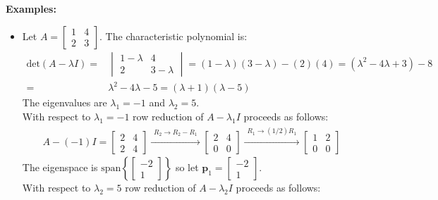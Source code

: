 \documentclass{article}
\begin{document}
\vspace{5mm}


\textbf{Examples:}
\begin{itemize}
\item Let \(A = \begin{bmatrix} 1 & 4 \\ 2 & 3 \end{bmatrix}\). The characteristic polynomial is:
\begin{align*}
\text{det}(A - \lambda I) = & \begin{vmatrix}
1 - \lambda & 4 \\ 
2 & 3 - \lambda 
\end{vmatrix} = (1 - \lambda)(3 - \lambda) - (2)(4) = (\lambda^2 - 4\lambda + 3) - 8 \\
= & \lambda^2 - 4\lambda - 5 = (\lambda + 1)(\lambda - 5)
\end{align*}
The eigenvalues are \(\lambda_1 = -1\) and \(\lambda_2 = 5\). \\
With respect to \(\lambda_1 = -1\) row reduction of \(A - \lambda_1 I\) proceeds as follows: 
\begin{align*}
A - (-1) I = 
\begin{bmatrix} 
2 & 4 \\ 
2 & 4 
\end{bmatrix} 
\xrightarrow{\begin{array}{c} R_2 \rightarrow R_2 - R_1 \end{array}} 
\begin{bmatrix} 
2 & 4 \\ 
0 & 0 
\end{bmatrix} 
\xrightarrow{\begin{array}{c} R_1 \rightarrow (1/2)R_1 \end{array}} 
\begin{bmatrix} 
1 & 2 \\ 
0 & 0 
\end{bmatrix} 
\end{align*} 
The eigenspace is \(\text{span}\left\{\begin{bmatrix} -2 \\ 1 \end{bmatrix}\right\}\) so let \(\mathbf{p}_1 = \begin{bmatrix} -2 \\ 1 \end{bmatrix}\). \\
With respect to \(\lambda_2 = 5\) row reduction of \(A - \lambda_2 I\) proceeds as follows: 

\end{itemize}
\end{document}

